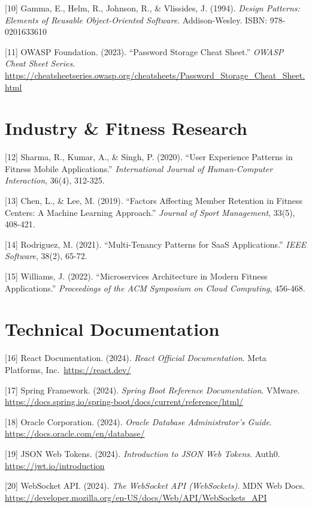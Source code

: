 \documentclass[
  12pt,
  a4paperpaper,
]{report}
\begin{document}
{[}10{]} Gamma, E., Helm, R., Johnson, R., \& Vlissides, J. (1994).
\emph{Design Patterns: Elements of Reusable Object-Oriented Software}.
Addison-Wesley. ISBN: 978-0201633610

{[}11{]} OWASP Foundation. (2023). ``Password Storage Cheat Sheet.''
\emph{OWASP Cheat Sheet Series}.
\url{https://cheatsheetseries.owasp.org/cheatsheets/Password_Storage_Cheat_Sheet.html}


\section{Industry \& Fitness Research}\label{industry-fitness-research}

{[}12{]} Sharma, R., Kumar, A., \& Singh, P. (2020). ``User Experience
Patterns in Fitness Mobile Applications.'' \emph{International Journal
of Human-Computer Interaction}, 36(4), 312-325.

{[}13{]} Chen, L., \& Lee, M. (2019). ``Factors Affecting Member
Retention in Fitness Centers: A Machine Learning Approach.''
\emph{Journal of Sport Management}, 33(5), 408-421.

{[}14{]} Rodriguez, M. (2021). ``Multi-Tenancy Patterns for SaaS
Applications.'' \emph{IEEE Software}, 38(2), 65-72.

{[}15{]} Williams, J. (2022). ``Microservices Architecture in Modern
Fitness Applications.'' \emph{Proceedings of the ACM Symposium on Cloud
Computing}, 456-468.


\section{Technical Documentation}\label{technical-documentation}

{[}16{]} React Documentation. (2024). \emph{React Official
Documentation}. Meta Platforms, Inc.~\url{https://react.dev/}

{[}17{]} Spring Framework. (2024). \emph{Spring Boot Reference
Documentation}. VMware.
\url{https://docs.spring.io/spring-boot/docs/current/reference/html/}

{[}18{]} Oracle Corporation. (2024). \emph{Oracle Database
Administrator's Guide}. \url{https://docs.oracle.com/en/database/}

{[}19{]} JSON Web Tokens. (2024). \emph{Introduction to JSON Web
Tokens}. Auth0. \url{https://jwt.io/introduction}

{[}20{]} WebSocket API. (2024). \emph{The WebSocket API (WebSockets)}.
MDN Web Docs.
\url{https://developer.mozilla.org/en-US/docs/Web/API/WebSockets_API}
\end{document}
